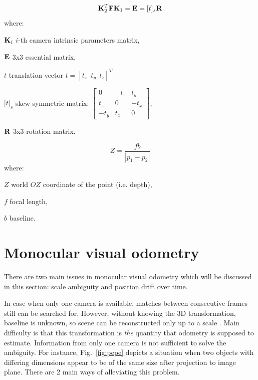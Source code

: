 \begin{equation}
\textbf{K}_{2}^{T}\textbf{F}\textbf{K}_{1}=\textbf{E}=[t]_{s}\textbf{R}
\label{eq:ess}
\end{equation}
where:
\begin{eqwhere}[2cm]
	\item[$\textbf{K}_{i}$] $i$-th camera intrinsic parameters matrix,
	\item[$\textbf{E}$] 3x3 essential matrix,
	\item[$t$] translation vector $t=[t_{x}\ \ t_{y}\ \ t_{z}]^T$
	\item[$\lbrack t \rbrack _{s}$] skew-symmetric matrix: $\begin{bmatrix}
		0 & -t_{z} & t_{y} \\ 
		t_{z} & 0 & -t_{x} \\ 
		-t_{y} & t_{x} & 0
	\end{bmatrix}$,
	\item[$\textbf{R}$] 3x3 rotation matrix.
\end{eqwhere}

\begin{equation}
Z = \frac{fb}{|p_{1}-p_{2}|}
\label{eq:disparity}
\end{equation}
where:
\begin{eqwhere}[2cm]
	\item[$Z$] world $OZ$ coordinate of the point (i.e. depth),
	\item[$f$] focal length,
	\item[$b$] baseline.
\end{eqwhere}


\section{Monocular visual odometry}
\label{sec:mono}

There are two main issues in monocular visual odometry which will be discussed in this section: scale ambiguity and position drift over time.

In case when only one camera is available, matches between consecutive frames still can be searched for. However, without knowing the 3D transformation, baseline is unknown, so scene can be reconstructed only up to a scale \cite{hartley2003multiple} \cite{szeliski}. Main difficulty is that this transformation is \textit{the} quantity that odometry is supposed to estimate. Information from only one camera is not sufficient to solve the ambiguity. For instance, Fig.~\ref{fig:pepe} depicts a situation when two objects with differing dimensions appear to be of the same size after projection to image plane. There are 2 main ways of alleviating this problem.


